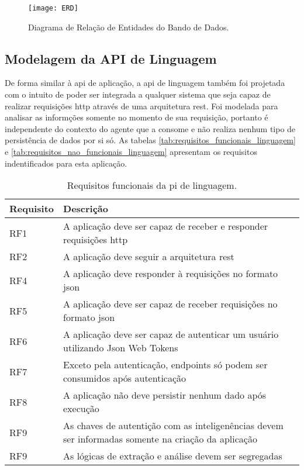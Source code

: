 \begin{figure}[H]
  \captionsetup{width=0.43\textwidth}
  \caption{Diagrama de Relação de Entidades do Bando de Dados.}
  \label{fig:ERD}
  \texttt{[image: ERD]}
  \fonte{}
\end{figure}

\subsection{Modelagem da API de Linguagem}\label{subsec:modelagem_linguagem}

De forma similar à \gls{api} de aplicação, a \gls{api} de linguagem também foi projetada com o intuito de poder ser integrada a qualquer sistema que seja capaz de realizar requisições \gls{http} através de uma arquitetura \gls{rest}. Foi modelada para analisar as informções somente no momento de sua requisição, portanto é independente do contexto do agente que a consome e não realiza nenhum tipo de persistência de dados por si só. As tabelas \autoref{tab:requisitos_funcionais_linguagem} e \autoref{tab:requisitos_nao_funcionais_linguagem} apresentam os requisitos indentificados para esta aplicação.

\begin{table}[H]
  \caption{Requisitos funcionais da pi de linguagem.}
  \label{tab:requisitos_funcionais_linguagem}
  \begin{tabularx}{\textwidth}{l|l}
    \hline
    \textbf{Requisito} & \textbf{Descrição}                                                             \\ \hline
    RF1                & A aplicação deve ser capaz de receber e responder requisições \gls{http}       \\
    RF2                & A aplicação deve seguir a arquitetura \gls{rest}                               \\
    RF4                & A aplicação deve responder à requisições no formato \gls{json}                 \\
    RF5                & A aplicação deve ser capaz de receber requisições no formato \gls{json}        \\
    RF6                & A aplicação deve ser capaz de autenticar um usuário utilizando Json Web Tokens \\
    RF7                & Exceto pela autenticação, endpoints só podem ser consumidos após autenticação  \\
    RF8                & A aplicação não deve persistir nenhum dado após execução                       \\
    RF9                & As chaves de autentição com as inteligenências devem ser informadas
    somente na criação da aplicação                                                                     \\
    RF9                & As lógicas de extração e análise devem ser segregadas                          \\ \hline
  \end{tabularx}
  \fonte{}
\end{table}

